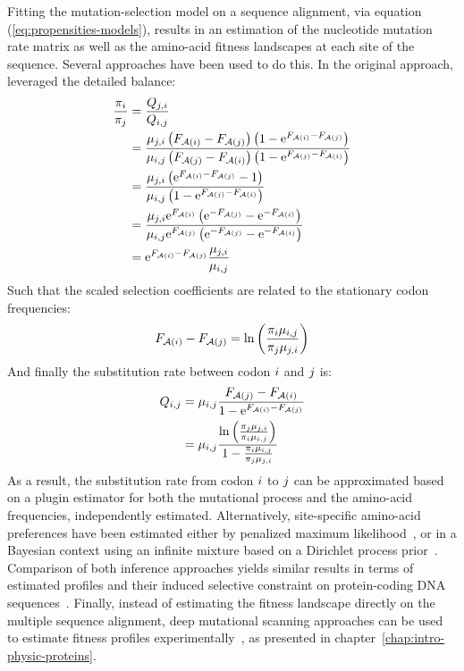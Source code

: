 Fitting the mutation-selection model on a sequence alignment, via equation (\ref{eq:propensities-models}), results in an estimation of the nucleotide mutation rate matrix as well as the amino-acid fitness landscapes at each site of the sequence.
Several approaches have been used to do this.
In the original approach, \citet{Halpern1998} leveraged the detailed balance:
\begin{align}
    \frac{\pi_{{i}}}{\pi_{{j}}} & = \frac{Q_{{j}, {i}}}{Q_{{i}, {j}}} \\
    & = \frac{\mu_{{j}, {i}} \left( F_{\mathcal{A}({i})} - F_{\mathcal{A}({j})} \right) \left(1 - \text{e}^{F_{\mathcal{A}({i})} - F_{\mathcal{A}({j})}} \right)}{\mu_{{i}, {j}}\left( F_{\mathcal{A}({j})} - F_{\mathcal{A}({i})} \right) \left(1 - \text{e}^{F_{\mathcal{A}({j})} - F_{\mathcal{A}({i})}} \right)} \\
    & =  \frac{\mu_{{j}, {i}} \left(\text{e}^{F_{\mathcal{A}({i})} - F_{\mathcal{A}({j})}} - 1 \right)}{\mu_{{i}, {j}} \left(1 - \text{e}^{F_{\mathcal{A}({j})} - F_{\mathcal{A}({i})}} \right)} \\
    & =  \frac{\mu_{{j}, {i}} \text{e}^{F_{\mathcal{A}({i})}} \left(\text{e}^{- F_{\mathcal{A}({j})}} - \text{e}^{- F_{\mathcal{A}({i})}} \right)}{\mu_{{i}, {j}}  \text{e}^{F_{\mathcal{A}({j})}} \left(\text{e}^{- F_{\mathcal{A}({j})}} - \text{e}^{- F_{\mathcal{A}({i})}} \right)} \\
    & =  \text{e}^{F_{\mathcal{A}({i})} - F_{\mathcal{A}({j})}} \frac{\mu_{{j}, {i}} }{\mu_{{i}, {j}}}
\end{align}
Such that the scaled selection coefficients are related to the stationary \gls{codon} frequencies:
\begin{equation}
    F_{\mathcal{A}({i})} - F_{\mathcal{A}({j})} = \ln \left( \frac{\pi_{{i}} \mu_{{i}, {j}} }{\pi_{{j}} \mu_{{j}, {i}}} \right)
\end{equation}
And finally the \gls{substitution} rate between \gls{codon} ${i}$ and ${j}$ is:
\begin{align}
    Q_{{i}, {j}} & = \mu_{{i}, {j}} \dfrac{F_{\mathcal{A}({j})} - F_{\mathcal{A}({i})}}{1 - \text{e}^{F_{\mathcal{A}({i})} - F_{\mathcal{A}({j})}} } \\
    & = \mu_{{i}, {j}} \frac{ \ln \left( \frac{\pi_{{j}} \mu_{{j}, {i}}}{\pi_{{i}} \mu_{{i}, {j}} } \right) }{ 1 -  \frac{\pi_{{i}} \mu_{{i}, {j}} }{\pi_{{j}} \mu_{{j}, {i}}} }
\end{align}
As a result, the \gls{substitution} rate from \gls{codon} ${i}$ to ${j}$ can be approximated based on a plugin estimator for both the mutational process and the amino-acid frequencies, independently estimated.
Alternatively, site-specific amino-acid preferences have been estimated either by penalized maximum likelihood~\citep{Tamuri2012,Tamuri2014}, or in a Bayesian context using an infinite mixture based on a \gls{Dirichlet process} prior~\citep{Rodrigue2010, Rodrigue2014}.
Comparison of both inference approaches yields similar results in terms of estimated profiles and their induced selective constraint on protein-coding \acrshort{DNA} sequences~\citep{Spielman2016a}.
Finally, instead of estimating the fitness landscape directly on the multiple sequence alignment, deep mutational scanning approaches can be used to estimate fitness profiles experimentally~\citep{Bloom2014,Bloom2014a}, as presented in chapter~\ref{chap:intro-physic-proteins}.

